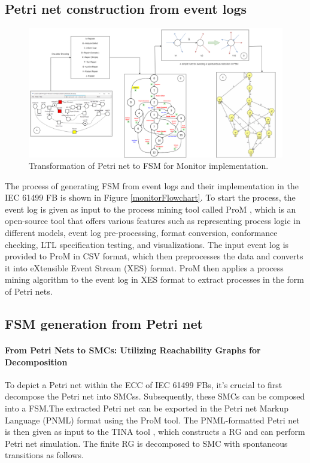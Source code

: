 \documentclass{ieeeojies}
\begin{document}
\subsection{Petri net construction from event logs}



\begin{figure}[!t]
	\centering
	\includegraphics[width=1\textwidth]{images/PN2FSM.png}
	\caption{Transformation of Petri net to FSM for Monitor implementation.}
	\label{TR_PN2FSM}
\end{figure}


The process of generating FSM from event logs and their implementation in the IEC 61499 FB is shown in Figure \ref{monitorFlowchart}. To start the process, the event log is given as input to the process mining tool called ProM \cite{ProM}, which is an open-source tool that offers various features such as representing process logic in different models, event log pre-processing, format conversion, conformance checking, LTL specification testing, and visualizations. The input event log is provided to ProM in CSV format, which then preprocesses the data and converts it into eXtensible Event Stream (XES) format. ProM then applies a process mining algorithm to the event log in XES format to extract processes in the form of Petri nets.


\subsection{ FSM generation from Petri net
}

\paragraph{From Petri Nets to SMCs: Utilizing Reachability Graphs for Decomposition}


To depict a Petri net within the ECC of IEC 61499 FBs, it's crucial to first decompose the Petri net into SMCss. Subsequently, these SMCs can be composed into a FSM.The extracted Petri net can be exported in the Petri net Markup Language (PNML) format using the ProM tool. The PNML-formatted Petri net is then given as input to the TINA tool  \cite{berthomieu2004tool}, which constructs a RG and can perform Petri net simulation. The finite RG is decomposed to SMC with spontaneous transitions as follows. 
\end{document}
